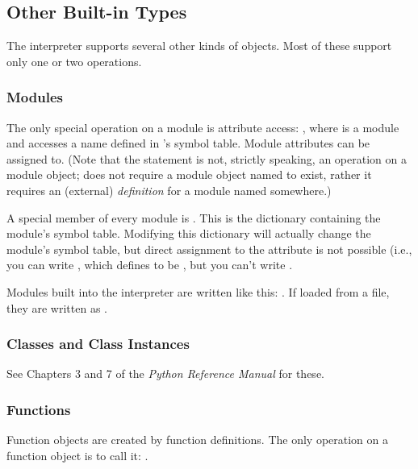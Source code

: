 \subsection{Other Built-in Types \label{typesother}}

The interpreter supports several other kinds of objects.
Most of these support only one or two operations.


\subsubsection{Modules \label{typesmodules}}

The only special operation on a module is attribute access:
, where  is a module and 
accesses a name defined in 's symbol table.  Module attributes
can be assigned to.  (Note that the  statement is not,
strictly speaking, an operation on a module object;  does not require a module object named  to exist,
rather it requires an (external) \emph{definition} for a module named
 somewhere.)

A special member of every module is .
This is the dictionary containing the module's symbol table.
Modifying this dictionary will actually change the module's symbol
table, but direct assignment to the  attribute is not
possible (i.e., you can write , which
defines  to be , but you can't write
.

Modules built into the interpreter are written like this:
.  If loaded from a file, they are
written as .


\subsubsection{Classes and Class Instances \label{typesobjects}}

See Chapters 3 and 7 of the \emph{Python Reference Manual} for these.


\subsubsection{Functions \label{typesfunctions}}

Function objects are created by function definitions.  The only
operation on a function object is to call it:
.

